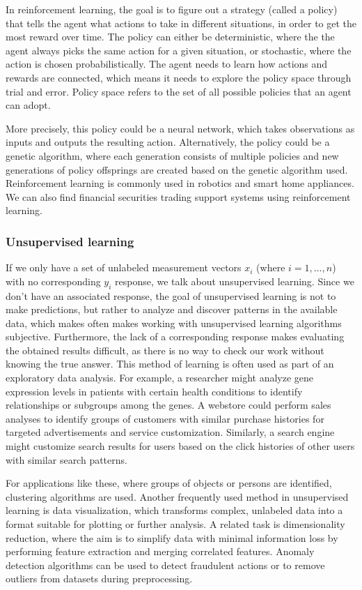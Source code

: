 \documentclass[a4paper,oneside,onecolumn,12pt]{book}
\begin{document}
		In reinforcement learning, the goal is to figure out a strategy (called a policy) that tells the agent what actions to take in different situations, in order to get the most reward over time. The policy can either be deterministic, where the the agent always picks the same action for a given situation, or stochastic, where the action is chosen probabilistically. The agent needs to learn how actions and rewards are connected, which means it needs to explore the policy space through trial and error. Policy space refers to the set of all possible policies that an agent can adopt. \cite{RLRAS}

		More precisely, this policy could be a neural network, which takes observations as inputs and outputs the resulting action. Alternatively, the policy could be a genetic algorithm, where each generation consists of multiple policies and new generations of policy offsprings are created based on the genetic algorithm used. Reinforcement learning is commonly used in robotics and smart home appliances. We can also find financial securities trading support systems using reinforcement learning. \cite{HMLSKT}

		\subsubsection{Unsupervised learning}
		If we only have a set of unlabeled measurement vectors $x_i$ (where $i = 1, ..., n$) with no corresponding $y_i$ response, we talk about unsupervised learning. Since we don't have an associated response, the goal of unsupervised learning is not to make predictions, but rather to analyze and discover patterns in the available data, which makes often makes working with unsupervised learning algorithms subjective. Furthermore, the lack of a corresponding response makes evaluating the obtained results difficult, as there is no way to check our work without knowing the true answer. This method of learning is often used as part of an exploratory data analysis. For example, a researcher might analyze gene expression levels in patients with certain health conditions to identify relationships or subgroups among the genes. A webstore could perform sales analyses to identify groups of customers with similar purchase histories for targeted advertisements and service customization. Similarly, a search engine might customize search results for users based on the click histories of other users with similar search patterns. \cite{AISL} 

		For applications like these, where groups of objects or persons are identified, clustering algorithms are used. Another frequently used method in unsupervised learning is data visualization, which transforms complex, unlabeled data into a format suitable for plotting or further analysis. A related task is dimensionality reduction, where the aim is to simplify data with minimal information loss by performing feature extraction and merging correlated features. Anomaly detection algorithms can be used to detect fraudulent actions or to remove outliers from datasets during preprocessing. \cite{HMLSKT}
\end{document}
